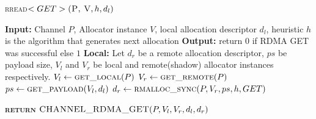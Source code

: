 \documentclass[10pt]{article}
\begin{document}
\begin{algorithm}{}
\footnotesize
\caption{\textsc{rread}{$<GET>\textsc{(P, V}, h, d_l)$}}
\label{alg:rread_GET} 
\begin{algorithmic}[1]


\STATE \textbf{Input:} Channel $P$, Allocator instance $V$, local allocation descriptor $d_l$,  heuristic $h$ is the algorithm that generates next allocation
\STATE \textbf{Output:} return {$0$} if RDMA GET was successful else {$1$}
\STATE \textbf{Local:} Let $d_r$ be a remote allocation descriptor,  $ps$ be payload size, $V_l$ and $V_r$ be local and remote(shadow) allocator instances respectively.
\STATE \quad $\textbf{$V_l$} \leftarrow  \textsc{get\_local}(P)$ 
\STATE \quad $\textbf{$V_r$} \leftarrow  \textsc{get\_remote}(P)$ 
\STATE \quad $\textbf{$ps$} \leftarrow  \textsc{get\_payload}(V_l, d_l)$ 
\STATE \quad $\textbf{$d_r$} \leftarrow  \textsc{rmalloc\_sync}(P, V_r, ps, h, GET)$ 

\STATE \textsc{\textbf{return}} {$\textsc{CHANNEL\_RDMA\_GET}(P, V_l, V_r, d_l, d_r)$}
\STATE


\end{algorithmic}
\end{algorithm}


\end{document}
